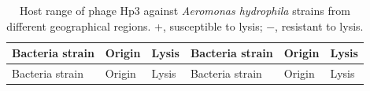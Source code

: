\documentclass[11pt,a4paper]{article}
\begin{document}
\begin{longtable}[]{@{}
  >{\raggedright\arraybackslash}p{}
  >{\raggedright\arraybackslash}p{}
  >{\centering\arraybackslash}p{}
  >{\raggedright\arraybackslash}p{}
  >{\raggedright\arraybackslash}p{}
  >{\centering\arraybackslash}p{}@{}}
\caption{Host range of phage Hp3 against \emph{Aeromonas hydrophila}
strains from different geographical regions. +, susceptible to lysis; −,
resistant to lysis.}\label{tbl-host-range}\tabularnewline
\toprule\noalign{}
\begin{minipage}[b]{\linewidth}\raggedright
Bacteria strain
\end{minipage} & \begin{minipage}[b]{\linewidth}\raggedright
Origin
\end{minipage} & \begin{minipage}[b]{\linewidth}\centering
Lysis
\end{minipage} & \begin{minipage}[b]{\linewidth}\raggedright
Bacteria strain
\end{minipage} & \begin{minipage}[b]{\linewidth}\raggedright
Origin
\end{minipage} & \begin{minipage}[b]{\linewidth}\centering
Lysis
\end{minipage} \\
\midrule\noalign{}
\endfirsthead
\toprule\noalign{}
\begin{minipage}[b]{\linewidth}\raggedright
Bacteria strain
\end{minipage} & \begin{minipage}[b]{\linewidth}\raggedright
Origin
\end{minipage} & \begin{minipage}[b]{\linewidth}\centering
Lysis
\end{minipage} & \begin{minipage}[b]{\linewidth}\raggedright
Bacteria strain
\end{minipage} & \begin{minipage}[b]{\linewidth}\raggedright
Origin
\end{minipage} & \begin{minipage}[b]{\linewidth}\centering
Lysis
\end{minipage} \\

\end{longtable}
\end{document}
